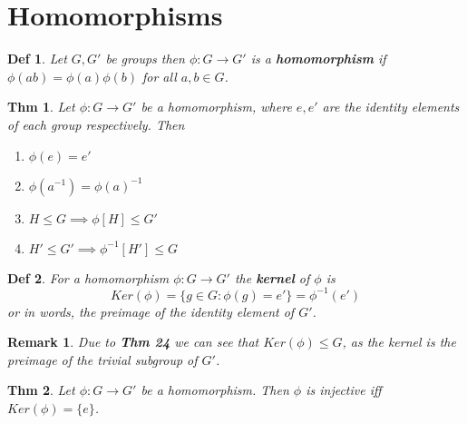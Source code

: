 \documentclass[paper=a4, fontsize=11pt]{scrartcl}
\newtheorem{theorem}{Thm}
\newtheorem{definition}{Def}
\newtheorem*{remark}{Remark}
\begin{document}
\vspace{0.25in}
\section{Homomorphisms}
\vspace{0.25in}

\begin{definition}
	Let $G,G'$ be groups then $\phi : G \to G'$ is a \textbf{homomorphism} if $\phi(ab)=\phi(a)\phi(b)$ for all $a,b \in G$.\\
\end{definition}

\begin{theorem}
	Let $\phi : G\to G'$ be a homomorphism, where $e,e'$ are the identity elements of each group respectively. Then 
	\begin{enumerate}[label=\arabic*)]
		\item $\phi(e)=e'$
		\item $\phi(a^{-1})=\phi(a)^{-1}$
		\item $H \leqslant G \implies \phi[H] \leqslant G' $
		\item $H' \leqslant G' \implies \phi^{-1}[H'] \leqslant G$\\
	\end{enumerate}
\end{theorem}

\begin{definition}
	For a homomorphism $\phi:G\to G'$ the \textbf{kernel} of $\phi$ is 
	\begin{equation}\nonumber
		Ker(\phi) = \{g\in G : \phi(g)=e' \} = \phi^{-1}(e')
	\end{equation}
	or in words, the preimage of the identity element of $G'$.\\
\end{definition}

\begin{remark}
	Due to \textbf{Thm 24} we can see that $Ker(\phi) \leqslant G$, as the kernel is the preimage of the trivial subgroup of $G'$.\\
\end{remark}

\begin{theorem}
	Let $\phi : G \to G'$ be a homomorphism. Then $\phi$ is injective iff $Ker(\phi)=\{e\}$.
\end{theorem}
\end{document}
